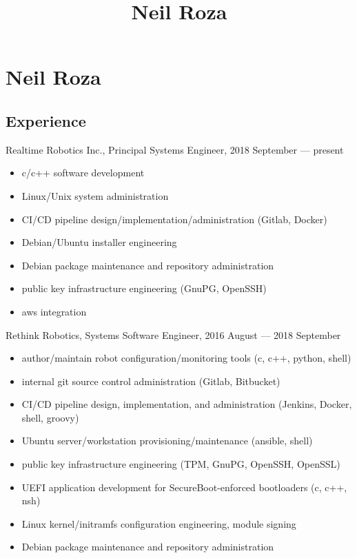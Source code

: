 \documentclass[letterpaper,11pt]{article}
\title{Neil Roza}
\begin{document}
\pagestyle{empty}

\section*{Neil Roza}



\subsection*{Experience}

Realtime Robotics Inc., Principal Systems Engineer, 2018 September --- present

\begin{itemize}
\item c/c++ software development
\item Linux/Unix system administration
\item CI/CD pipeline design/implementation/administration (Gitlab, Docker)
\item Debian/Ubuntu installer engineering
\item Debian package maintenance and repository administration
\item public key infrastructure engineering (GnuPG, OpenSSH)
\item aws integration
\end{itemize}

Rethink Robotics, Systems Software Engineer, 2016 August --- 2018 September

\begin{itemize}
\item author/maintain robot configuration/monitoring tools (c, c++, python,
  shell)
\item internal git source control administration (Gitlab, Bitbucket)
\item CI/CD pipeline design, implementation, and administration (Jenkins,
  Docker, shell, groovy)
\item Ubuntu server/workstation provisioning/maintenance (ansible, shell)
\item public key infrastructure engineering (TPM, GnuPG, OpenSSH, OpenSSL)
\item UEFI application development for SecureBoot-enforced bootloaders (c, c++,
  nsh)
\item Linux kernel/initramfs configuration engineering, module signing
\item Debian package maintenance and repository administration
\end{itemize}
\end{document}

